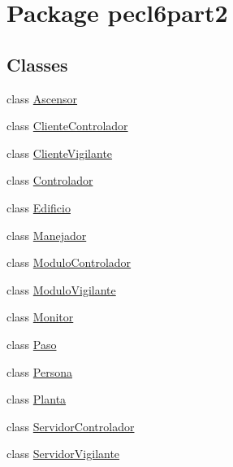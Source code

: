 \hypertarget{namespacepecl6part2}{}\section{Package pecl6part2}
\label{namespacepecl6part2}
\subsection*{Classes}
\begin{DoxyCompactItemize}
\item 
class \mbox{\hyperlink{classpecl6part2_1_1_ascensor}{Ascensor}}
\item 
class \mbox{\hyperlink{classpecl6part2_1_1_cliente_controlador}{Cliente\+Controlador}}
\item 
class \mbox{\hyperlink{classpecl6part2_1_1_cliente_vigilante}{Cliente\+Vigilante}}
\item 
class \mbox{\hyperlink{classpecl6part2_1_1_controlador}{Controlador}}
\item 
class \mbox{\hyperlink{classpecl6part2_1_1_edificio}{Edificio}}
\item 
class \mbox{\hyperlink{classpecl6part2_1_1_manejador}{Manejador}}
\item 
class \mbox{\hyperlink{classpecl6part2_1_1_modulo_controlador}{Modulo\+Controlador}}
\item 
class \mbox{\hyperlink{classpecl6part2_1_1_modulo_vigilante}{Modulo\+Vigilante}}
\item 
class \mbox{\hyperlink{classpecl6part2_1_1_monitor}{Monitor}}
\item 
class \mbox{\hyperlink{classpecl6part2_1_1_paso}{Paso}}
\item 
class \mbox{\hyperlink{classpecl6part2_1_1_persona}{Persona}}
\item 
class \mbox{\hyperlink{classpecl6part2_1_1_planta}{Planta}}
\item 
class \mbox{\hyperlink{classpecl6part2_1_1_servidor_controlador}{Servidor\+Controlador}}
\item 
class \mbox{\hyperlink{classpecl6part2_1_1_servidor_vigilante}{Servidor\+Vigilante}}
\end{DoxyCompactItemize}
